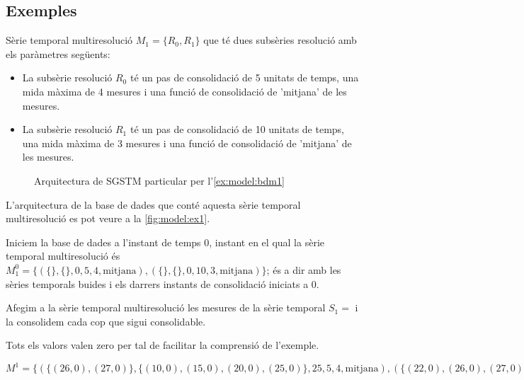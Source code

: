 \subsection{Exemples}

\begin{example} 
\label{ex:model:bdm1}%


Sèrie temporal multiresolució $M_1=\{R_0,R_1\}$ que té dues subsèries
resolució amb els paràmetres següents:
\begin{itemize}
\item La subsèrie resolució $R_0$ té un pas de consolidació de 5
  unitats de temps, una mida màxima de 4 mesures i una funció de
  consolidació de 'mitjana' de les mesures.
\item La subsèrie resolució $R_1$ té un pas de consolidació de 10
  unitats de temps, una mida màxima de 3 mesures i una funció de
  consolidació de 'mitjana' de les mesures.
\end{itemize}

\begin{figure}[tp]
\centering

\caption{Arquitectura de SGSTM particular per l'\autoref{ex:model:bdm1}}
\label{fig:model:ex1}
\end{figure}

L'arquitectura de la base de dades que conté aquesta sèrie temporal
multiresolució es pot veure a la \autoref{fig:model:ex1}.


Iniciem la base de dades a l'instant de temps 0, instant en el qual la
sèrie temporal multiresolució és $M_1^0 = \{ ( \{\} , \{\} , 0 , 5 ,4
, \text{mitjana} ) , ( \{\} , \{\} , 0 , 10 ,3 , \text{mitjana} ) \}$;
és a dir amb les sèries temporals buides i els darrers instants de
consolidació iniciats a 0.



Afegim a la sèrie temporal multiresolució les mesures de la sèrie
temporal $S_1=$\todo{} i la consolidem cada cop que sigui consolidable.

Tots els valors valen zero per tal de facilitar la comprensió de l'exemple.



$M^1 = \{ ( \{(26,0),(27,0)\}  , \{(10,0),(15,0),(20,0),(25,0)\} , 25 , 5 ,4 , \text{mitjana} ) , ( \{(22,0),(26,0),(27,0)\} , \{(0,0),(10,0),(20,0)\} , 20 , 10 ,3 , \text{mitjana} ) \}$



\end{example}
